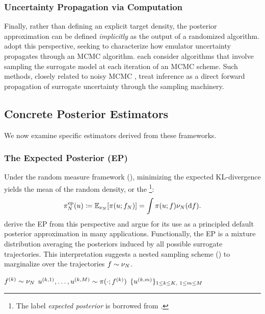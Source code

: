 \documentclass[12pt]{article}
\begin{document}
\subsubsection{Uncertainty Propagation via Computation} \label{sec:unc-prop-computation}
Finally, rather than defining an explicit target density, the posterior approximation can be defined 
\textit{implicitly} as the output of a randomized algorithm. \citet{gpEmMCMC} adopt this perspective,
seeking to characterize how emulator uncertainty propagates through an MCMC algorithm.
\citet{FerEmulation,ourSurrPropPaper} each consider algorithms
that involve sampling the surrogate model at each iteration of an MCMC scheme.
Such methods, closely related to noisy MCMC \citep{noisyMCSurvey,noisyMCMC}, 
treat inference as a direct forward propagation of surrogate uncertainty through the sampling machinery.


\subsection{Concrete Posterior Estimators}
We now examine specific estimators derived from these frameworks.

\subsubsection{The Expected Posterior (EP)}
Under the random measure framework (), minimizing the expected KL-divergence 
yields the mean of the random density, or the 
\footnote{The label \textit{expected posterior} is borrowed from \citet{BurknerSurrogate}.}:
\begin{align}
\postApproxEP(\Par) \Def \emE[\postDensNorm(\Par; \targetEm)] = \int \postDensNorm(\Par; \targetTraj) \emDist(\d\targetTraj).
\label{eq:ep}
\end{align}
\citet{ourSurrPropPaper} derive the EP from this perspective and argue for its use as a principled default 
posterior approximation in many applications. Functionally, the EP is a mixture distribution averaging the 
posteriors induced by all possible surrogate trajectories. This interpretation suggests a nested sampling 
scheme () to marginalize over the trajectories $f \sim \nu_{N}$.

\begin{algorithm}[H]
    \caption{Direct sampling from $\postApproxEP$}
    \label{alg:ep}
    \begin{algorithmic}[1]
        		\State $f^{(k)} \sim \nu_{N}$ 
		\State $u^{(k, 1)}, \dots, u^{(k, M)} \sim \pi(\cdot; f^{(k)})$ 
	\EndFor
	\State \Return $\{u^{(k, m)}\}_{1 \leq k \leq K, \ 1 \leq m \leq M}$
	\EndFunction
    \end{algorithmic}
\end{algorithm}
\end{document}
